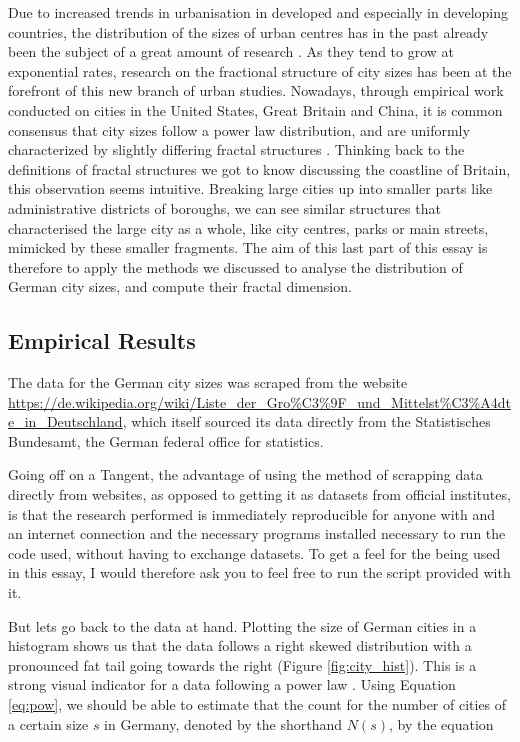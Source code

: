 \documentclass{article}[12pt]
\begin{document}
Due to increased trends in urbanisation in developed and especially in developing countries, the distribution of the sizes of urban centres has in the past already been the subject of a great amount of research \citep{chen2003rank, arcaute2015constructing, batty1987urban}. As they tend to grow at exponential rates, research on the fractional structure of city sizes has been at the forefront of this new branch of urban studies. Nowadays, through empirical work conducted on cities in the United States, Great Britain and China, it is common consensus that city sizes follow a power law distribution, and are uniformly characterized by slightly differing fractal structures \citep{newman2005power, batty1987urban}. Thinking back to the definitions of fractal structures we got to know discussing the coastline of Britain, this observation seems intuitive. Breaking large cities up into smaller parts like administrative districts of boroughs, we can see similar structures that characterised the large city as a whole, like city centres, parks or main streets, mimicked by these smaller fragments. The aim of this last part of this essay is therefore to apply the methods we discussed to analyse the distribution of German city sizes, and compute their fractal dimension. 

\subsection{Empirical Results}
The data for the German city sizes was scraped from the website \newline \scriptsize \url{https://de.wikipedia.org/wiki/Liste_der_Gro%C3%9F_und_Mittelst%C3%A4dte_in_Deutschland}, \newline \normalsize which itself sourced its data directly from the Statistisches Bundesamt, the German federal office for statistics.

Going off on a Tangent, the advantage of using the method of scrapping data directly from websites, as opposed to getting it as datasets from official institutes, is that the research performed is immediately reproducible for anyone with and an internet connection and the necessary programs installed necessary to run the code used, without having to exchange datasets. To get a feel for the being used in this essay, I would therefore ask you to feel free to run the script provided with it.

But lets go back to the data at hand. Plotting the size of German cities in a histogram shows us that the data follows a right skewed distribution with a pronounced fat tail going towards the right (Figure \ref{fig:city_hist}). This is a strong visual indicator for a data following a power law \citep{newman2005power}. Using Equation \ref{eq:pow}, we should be able to estimate that the count for the number of cities of a certain size $s$ in Germany, denoted by the shorthand $N(s)$, by the equation
\end{document}
